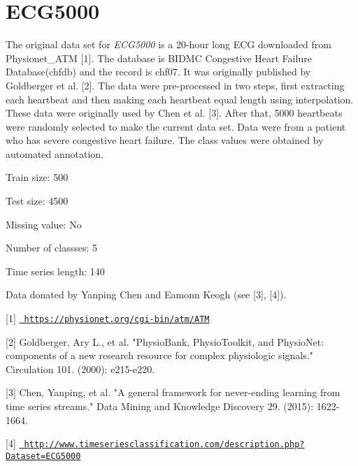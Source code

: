 \chapter{ECG5000}
\hypertarget{md_external_2data_2UCRArchive__2018_2ECG5000_2README}{}\label{md_external_2data_2UCRArchive__2018_2ECG5000_2README}
\label{md_external_2data_2UCRArchive__2018_2ECG5000_2README_autotoc_md59}%
%
 The original data set for {\itshape ECG5000} is a 20-\/hour long ECG downloaded from Physionet\+\_\+\+ATM \mbox{[}1\mbox{]}. The database is BIDMC Congestive Heart Failure Database(chfdb) and the record is chf07. It was originally published by Goldberger et al. \mbox{[}2\mbox{]}. The data were pre-\/processed in two steps, first extracting each heartbeat and then making each heartbeat equal length using interpolation. These data were originally used by Chen et al. \mbox{[}3\mbox{]}. After that, 5000 heartbeats were randomly selected to make the current data set. Data were from a patient who has severe congestive heart failure. The class values were obtained by automated annotation.

Train size\+: 500

Test size\+: 4500

Missing value\+: No

Number of classses\+: 5

Time series length\+: 140

Data donated by Yanping Chen and Eamonn Keogh (see \mbox{[}3\mbox{]}, \mbox{[}4\mbox{]}).

\mbox{[}1\mbox{]} \href{https://physionet.org/cgi-bin/atm/ATM}{\texttt{ https\+://physionet.\+org/cgi-\/bin/atm/\+ATM}}

\mbox{[}2\mbox{]} Goldberger, Ary L., et al. "{}\+Physio\+Bank, Physio\+Toolkit, and Physio\+Net\+: components of a new research resource for complex physiologic signals."{} Circulation 101. (2000)\+: e215-\/e220.

\mbox{[}3\mbox{]} Chen, Yanping, et al. "{}\+A general framework for never-\/ending learning from time series streams."{} Data Mining and Knowledge Discovery 29. (2015)\+: 1622-\/1664.

\mbox{[}4\mbox{]} \href{http://www.timeseriesclassification.com/description.php?Dataset=ECG5000}{\texttt{ http\+://www.\+timeseriesclassification.\+com/description.\+php?\+Dataset=\+ECG5000}} 